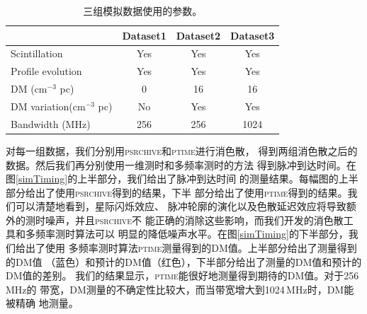 \begin{table}
\begin{center}
\caption{三组模拟数据使用的参数。}
\label{simTable}
\begin{tabular}{lccc}
\hline
                           &    Dataset1   &   Dataset2    &   Dataset3   \\
\hline                                                                    
Scintillation              &     Yes       &   Yes         &    Yes       \\
Profile evolution          &     Yes       &   Yes         &    Yes       \\
DM (cm$^{-3}$ pc)          &     0         &   16          &    16        \\
DM variation(cm$^{-3}$ pc) &     No        &   Yes         &    Yes       \\
Bandwidth (MHz)            &     256       &   256         &    1024      \\
\hline
\end{tabular}
\end{center}
\end{table}

对每一组数据，我们分别用\textsc{psrchive}和\textsc{ptime}进行消色散，
得到两组消色散之后的数据。然后我们再分别使用一维测时和多频率测时的方法
得到脉冲到达时间。在图\ref{simTiming}的上半部分，我们给出了脉冲到达时间
的测量结果。每幅图的上半部分给出了使用\textsc{psrchive}得到的结果，下半
部分给出了使用\textsc{ptime}得到的结果。我们可以清楚地看到，星际闪烁效应、
脉冲轮廓的演化以及色散延迟效应将导致额外的测时噪声，并且\textsc{psrchive}不
能正确的消除这些影响，而我们开发的消色散工具和多频率测时算法可以
明显的降低噪声水平。在图\ref{simTiming}的下半部分，我们给出了使用
多频率测时算法\textsc{ptime}测量得到的DM值。上半部分给出了测量得到的DM值
（蓝色）和预计的DM值（红色），下半部分给出了测量的DM值和预计的DM值的差别。
我们的结果显示，\textsc{ptime}能很好地测量得到期待的DM值。对于256\,MHz的
带宽，DM测量的不确定性比较大，而当带宽增大到1024\,MHz时，DM能被精确
地测量。

